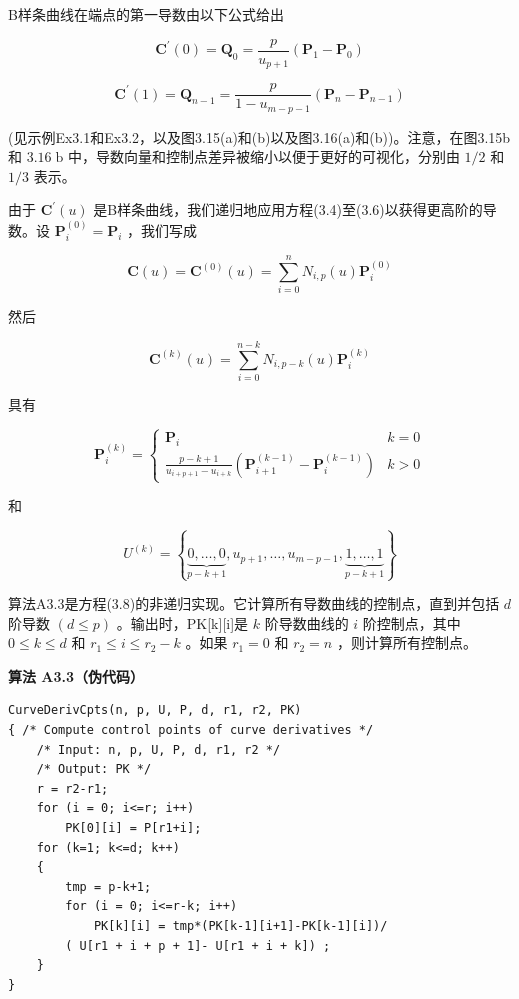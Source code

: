 \documentclass[../main.tex]{subfiles}
\begin{document}
B样条曲线在端点的第一导数由以下公式给出

\[
{\mathbf{C}}^{\prime }\left( 0\right)  = {\mathbf{Q}}_{0} = \frac{p}{{u}_{p + 1}}\left( {{\mathbf{P}}_{1} - {\mathbf{P}}_{0}}\right)
\]

\[
{\mathbf{C}}^{\prime }\left( 1\right)  = {\mathbf{Q}}_{n - 1} = \frac{p}{1 - {u}_{m - p - 1}}\left( {{\mathbf{P}}_{n} - {\mathbf{P}}_{n - 1}}\right)  \tag{3.7}
\]

(见示例Ex3.1和Ex3.2，以及图3.15(a)和(b)以及图3.16(a)和(b))。注意，在图3.15b和 \({3.16}\mathrm{\;b}\) 中，导数向量和控制点差异被缩小以便于更好的可视化，分别由 \(1/2\) 和 \(1/3\) 表示。

由于 \({\mathbf{C}}^{\prime }\left( u\right)\) 是B样条曲线，我们递归地应用方程(3.4)至(3.6)以获得更高阶的导数。设 \({\mathbf{P}}_{i}^{\left( 0\right) } = {\mathbf{P}}_{i}\) ，我们写成

\[
\mathbf{C}\left( u\right)  = {\mathbf{C}}^{\left( 0\right) }\left( u\right)  = \mathop{\sum }\limits_{{i = 0}}^{n}{N}_{i,p}\left( u\right) {\mathbf{P}}_{i}^{\left( 0\right) }
\]

然后

\[
{\mathbf{C}}^{\left( k\right) }\left( u\right)  = \mathop{\sum }\limits_{{i = 0}}^{{n - k}}{N}_{i,p - k}\left( u\right) {\mathbf{P}}_{i}^{\left( k\right) } \tag{3.8}
\]

具有

\[
{\mathbf{P}}_{i}^{\left( k\right) } = \left\{  \begin{array}{ll} {\mathbf{P}}_{i} & k = 0 \\  \frac{p - k + 1}{{u}_{i + p + 1} - {u}_{i + k}}\left( {{\mathbf{P}}_{i + 1}^{\left( k - 1\right) } - {\mathbf{P}}_{i}^{\left( k - 1\right) }}\right) & k > 0 \end{array}\right.
\]



和

\[
{U}^{\left( k\right) } = \left\{  {\underset{p - k + 1}{\underbrace{0,\ldots ,0}},{u}_{p + 1},\ldots ,{u}_{m - p - 1},\underset{p - k + 1}{\underbrace{1,\ldots ,1}}}\right\}
\]

算法A3.3是方程(3.8)的非递归实现。它计算所有导数曲线的控制点，直到并包括 \(d\) 阶导数 \(\left( {d \leq  p}\right)\) 。输出时，PK[k][i]是 \(k\) 阶导数曲线的 \(i\) 阶控制点，其中 \(0 \leq  k \leq  d\) 和 \({r}_{1} \leq  i \leq  {r}_{2} - k\) 。如果 \({r}_{1} = 0\) 和 \({r}_{2} = n\) ，则计算所有控制点。

\par\medskip\noindent\textbf{算法 A3.3（伪代码）}\par
\begin{verbatim}
CurveDerivCpts(n, p, U, P, d, r1, r2, PK)
{ /* Compute control points of curve derivatives */
    /* Input: n, p, U, P, d, r1, r2 */
    /* Output: PK */
    r = r2-r1;
    for (i = 0; i<=r; i++)
        PK[0][i] = P[r1+i];
    for (k=1; k<=d; k++)
    {
        tmp = p-k+1;
        for (i = 0; i<=r-k; i++)
            PK[k][i] = tmp*(PK[k-1][i+1]-PK[k-1][i])/
        ( U[r1 + i + p + 1]- U[r1 + i + k]) ;
    }
}
\end{verbatim}
\end{document}
